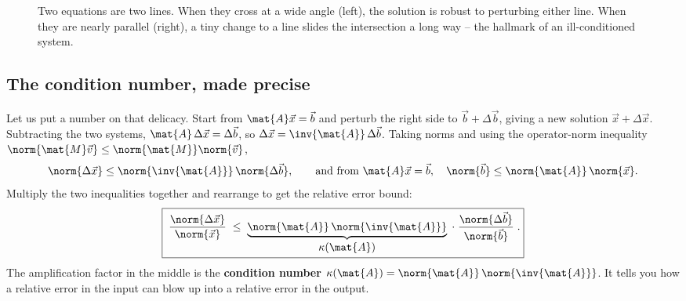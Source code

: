 \begin{figure}[H]
\centering
{}
\caption{Two equations are two lines. When they cross at a wide angle (left), the
solution is robust to perturbing either line. When they are nearly parallel (right),
a tiny change to a line slides the intersection a long way -- the hallmark of an
ill-conditioned system.}
\label{ch33:nearparallel}
\end{figure}

\subsection{The condition number, made precise}

Let us put a number on that delicacy. Start from $\mat{A}\vec{x}=\vec{b}$ and perturb
the right side to $\vec{b}+\Delta\vec{b}$, giving a new solution
$\vec{x}+\Delta\vec{x}$. Subtracting the two systems, $\mat{A}\,\Delta\vec{x} =
\Delta\vec{b}$, so $\Delta\vec{x} = \inv{\mat{A}}\,\Delta\vec{b}$. Taking norms and
using the operator-norm inequality $\norm{\mat{M}\vec{v}}\le\norm{\mat{M}}\norm{\vec{v}}$,
\[
  \norm{\Delta\vec{x}} \le \norm{\inv{\mat{A}}}\,\norm{\Delta\vec{b}},
  \qquad\text{and from } \mat{A}\vec{x}=\vec{b},\quad
  \norm{\vec{b}} \le \norm{\mat{A}}\,\norm{\vec{x}}.
\]
Multiply the two inequalities together and rearrange to get the relative error bound:
\[
  \boxed{\;\frac{\norm{\Delta\vec{x}}}{\norm{\vec{x}}}
   \;\le\; \underbrace{\norm{\mat{A}}\,\norm{\inv{\mat{A}}}}_{\displaystyle \kappa(\mat{A})}
   \;\cdot\; \frac{\norm{\Delta\vec{b}}}{\norm{\vec{b}}}\;.}
\]
The amplification factor in the middle is the \textbf{condition number}
$\kappa(\mat{A}) = \norm{\mat{A}}\,\norm{\inv{\mat{A}}}$. It tells you how a relative
error in the input can blow up into a relative error in the output.

